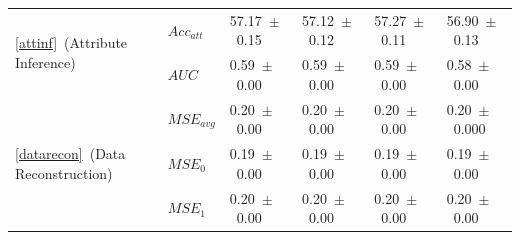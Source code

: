 \begin{table}[htb]
\begin{tabularx}{\textwidth}{l l X X X X}
        \multirow{2}{*}{\ref{attinf}~(Attribute Inference)}
            & $Acc_{att}$ & 57.17~$\pm$~0.15 & 57.12~$\pm$~0.12 & 57.27~$\pm$~0.11 & 56.90~$\pm$~0.13 \\
            & $AUC$ & 0.59~$\pm$~0.00 & 0.59~$\pm$~0.00 & 0.59~$\pm$~0.00 & 0.58~$\pm$~0.00 \\
        \midrule

        \multirow{3}{*}{\ref{datarecon}~(Data Reconstruction)}
            & $MSE_{avg}$ & 0.20~$\pm$~0.00 & 0.20~$\pm$~0.00 & 0.20~$\pm$~0.00 & 0.20~$\pm$~0.000 \\
            & $MSE_0$ & 0.19~$\pm$~0.00 & 0.19~$\pm$~0.00 & 0.19~$\pm$~0.00 & 0.19~$\pm$~0.00 \\
            & $MSE_1$ & 0.20~$\pm$~0.00 & 0.20~$\pm$~0.00 & 0.20~$\pm$~0.00 & 0.20~$\pm$~0.00 \\
        \bottomrule
    \end{tabularx}
\end{table}
